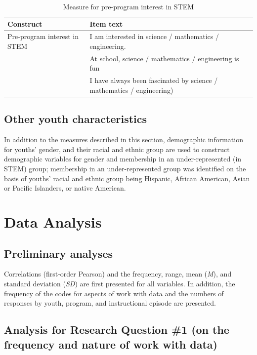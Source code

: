\documentclass[]{book}
\theoremstyle{definition}
\theoremstyle{definition}
\theoremstyle{definition}
\theoremstyle{remark}
\begin{document}
\begin{table}

\caption{\label{tab:unnamed-chunk-5}Measure for pre-program interest in STEM}
\centering
\begin{tabular}[t]{l>{\raggedright\arraybackslash}p{20em}}
\toprule
Construct & Item text\\
\midrule
Pre-program interest in STEM & I am interested in science / mathematics / engineering.\\
 & At school, science / mathematics / engineering is fun\\
 & I have always been fascinated by science / mathematics / engineering)\\
\bottomrule
\end{tabular}
\end{table}

\subsection{Other youth
characteristics}\label{other-youth-characteristics}

In addition to the measures described in this section, demographic
information for youths' gender, and their racial and ethnic group are
used to construct demographic variables for gender and membership in an
under-represented (in STEM) group; membership in an under-represented
group was identified on the basis of youths' racial and ethnic group
being Hispanic, African American, Asian or Pacific Islanders, or native
American.

\section{Data Analysis}\label{data-analysis}

\subsection{Preliminary analyses}\label{preliminary-analyses}

Correlations (first-order Pearson) and the frequency, range, mean
(\emph{M}), and standard deviation (\emph{SD}) are first presented for
all variables. In addition, the frequency of the codes for aspects of
work with data and the numbers of responses by youth, program, and
instructional episode are presented.

\subsection{Analysis for Research Question \#1 (on the frequency and
nature of work with
data)}\label{analysis-for-research-question-1-on-the-frequency-and-nature-of-work-with-data}
\end{document}

